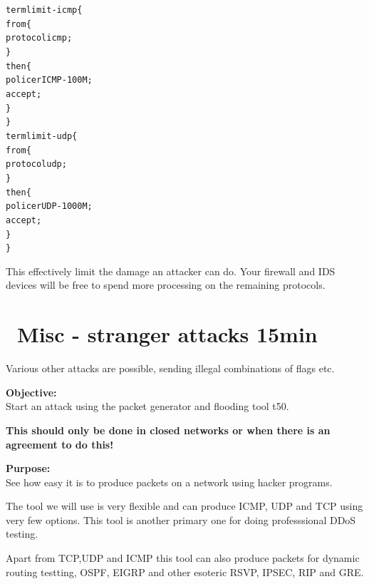 \documentclass[a4paper,11pt,notitlepage]{report}
\begin{document}
\begin{alltt}\footnotesize
term limit-icmp \{
    from \{
        protocol icmp;
    \}
    then \{
        policer ICMP-100M;
        accept;
    \}
\}
term limit-udp \{
    from \{
        protocol udp;
    \}
    then \{
        policer UDP-1000M;
        accept;
    \}
\}
\end{alltt}

This effectively limit the damage an attacker can do. Your firewall and IDS devices will be free to spend more processing on the remaining protocols.



\chapter{\faInfoCircle\ Misc - stranger attacks 15min}

Various other attacks are possible, sending illegal combinations of flags etc.



{\bf Objective:}\\
Start an attack using the packet generator and flooding tool t50.

{\color{red} \bf This should only be done in closed networks or when there is an agreement to do this!}

{\bf Purpose:}\\
See how easy it is to produce packets on a network using hacker programs.

The tool we will use is very flexible and can produce ICMP, UDP and TCP using very few options. This tool is another primary one for doing professsional DDoS testing.

Apart from TCP,UDP and ICMP this tool can also produce packets for dynamic routing testting, OSPF, EIGRP and other esoteric RSVP, IPSEC, RIP and GRE.
\end{document}
